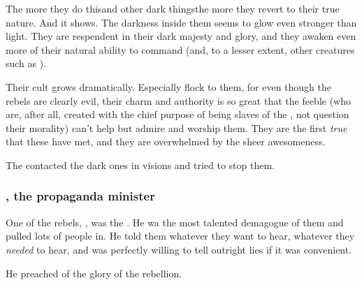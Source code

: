 The more they do this\dash and other dark things\dash the more they revert to their true nature. And it shows. The darkness inside them seems to glow even stronger than light. They are respendent in their dark majesty and glory, and they awaken even more of their natural ability to command \humans{} (and, to a lesser extent, other creatures such as \nephilim). 

Their cult grows dramatically. Especially \humans{} flock to them, for even though the rebels are clearly evil, their charm and authority is so great that the feeble \humans{} (who are, after all, created with the chief purpose of being slaves of the \resphain, not question their morality) can't help but admire and worship them. They are the first \emph{true} \resphain{} that these \humans{} have met, and they are overwhelmed by the sheer awesomeness. 

The  contacted the dark ones in visions and tried to stop them. 






\subsubsection{\Kezrabal, the propaganda minister}
One of the rebels, \Kezrabal, was the . 
He wa the most talented demagogue of them and pulled lots of people in. 
He told them whatever they want to hear, whatever they \emph{needed} to hear, and was perfectly willing to tell outright lies if it was convenient. 

He preached of the glory of the rebellion. 


